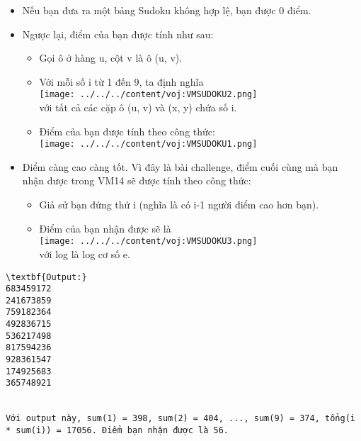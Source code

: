\begin{itemize}
	\item Nếu bạn đưa ra một bảng Sudoku không hợp lệ, bạn được 0 điểm.
	\item Ngược lại, điểm của bạn được tính như sau:
\begin{itemize}
	\item Gọi ô ở hàng u, cột v là ô (u, v).
	\item Với mỗi số i từ 1 đến 9, ta định nghĩa
\\
\texttt{[image: ../../../content/voj:VMSUDOKU2.png]}
\\với tất cả các cặp ô (u, v) và (x, y) chứa số i.
	\item Điểm của bạn được tính theo công thức:
\\
\texttt{[image: ../../../content/voj:VMSUDOKU1.png]}
\end{itemize}
	\item Điểm càng cao càng tốt. Vì đây là bài challenge, điểm cuối cùng mà bạn nhận được trong VM14 sẽ được tính theo công thức:
\begin{itemize}
	\item Giả sử bạn đứng thứ i (nghĩa là có i-1 người điểm cao hơn bạn).
	\item Điểm của bạn nhận được sẽ là
\\
\texttt{[image: ../../../content/voj:VMSUDOKU3.png]}
\\với log là log cơ số e.
\end{itemize}
\end{itemize}
\begin{verbatim}
\textbf{Output:}
683459172
241673859
759182364
492836715
536217498
817594236
928361547
174925683
365748921


Với output này, sum(1) = 398, sum(2) = 404, ..., sum(9) = 374, tổng(i * sum(i)) = 17056. Điểm bạn nhận được là 56.
\end{verbatim}